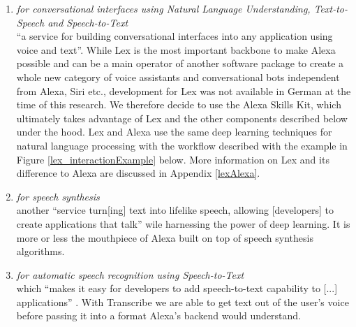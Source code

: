 \begin{enumerate}

	\item[\href{https://aws.amazon.com/lex/}{\textbf{Lex}} \footnote{\url{https://aws.amazon.com/lex}}] \textit{for conversational interfaces using Natural Language Understanding, Text-to-Speech and Speech-to-Text} \\
	``a service for building conversational interfaces into any application using voice and text''\cite{aws_website}.
	While Lex is the most important backbone to make Alexa possible and can be a main operator of another software package to create a whole new category of voice assistants and conversational bots independent from Alexa, Siri etc., development for Lex was not available in German at the time of this research. We therefore decide to use the Alexa Skills Kit, which ultimately takes advantage of Lex and the other components described below under the hood. Lex and Alexa use the same deep learning techniques for natural language processing with the workflow described with the example in Figure \ref{lex_interactionExample} below. More information on Lex and its difference to Alexa are discussed in Appendix \ref{lexAlexa}.
%	
%
%

	
	
	\item[\href{https://aws.amazon.com/polly/}{\textbf{Polly}} \footnote{\url{https://aws.amazon.com/polly}}] \textit{for speech synthesis\\}
	another ``service turn[ing] text into lifelike speech, allowing [developers] to create applications that talk'' \cite{aws_website} wile harnessing the power of deep learning. It is more or less the mouthpiece of Alexa built on top of speech synthesis algorithms.
	
%	
	
	
	\item[\href{https://aws.amazon.com/transcribe/}{\textbf{Transcribe}} \footnote{\url{https://aws.amazon.com/transcribe}}] \textit{for automatic speech recognition using Speech-to-Text}\\
	which ``makes it easy for developers to add speech-to-text capability to [...] applications'' \cite{aws_website}. With Transcribe we are able to get text out of the user's voice before passing it into a format Alexa's backend would understand.
	

\end{enumerate}
